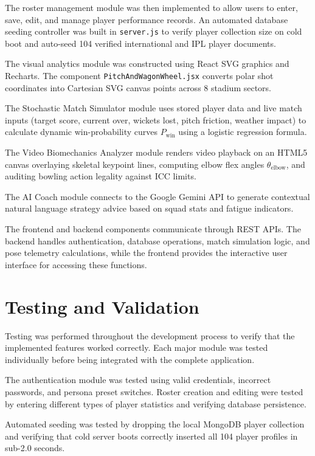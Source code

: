 The roster management module was then implemented to allow users to enter, save, edit, and manage player performance records. An automated database seeding controller was built in \texttt{server.js} to verify player collection size on cold boot and auto-seed 104 verified international and IPL player documents.

The visual analytics module was constructed using React SVG graphics and Recharts. The component \texttt{PitchAndWagonWheel.jsx} converts polar shot coordinates into Cartesian SVG canvas points across 8 stadium sectors.

The Stochastic Match Simulator module uses stored player data and live match inputs (target score, current over, wickets lost, pitch friction, weather impact) to calculate dynamic win-probability curves $P_{\text{win}}$ using a logistic regression formula.

The Video Biomechanics Analyzer module renders video playback on an HTML5 canvas overlaying skeletal keypoint lines, computing elbow flex angles $\theta_{\text{elbow}}$, and auditing bowling action legality against ICC limits.

The AI Coach module connects to the Google Gemini API to generate contextual natural language strategy advice based on squad stats and fatigue indicators.

The frontend and backend components communicate through REST APIs. The backend handles authentication, database operations, match simulation logic, and pose telemetry calculations, while the frontend provides the interactive user interface for accessing these functions.

\section{Testing and Validation}
Testing was performed throughout the development process to verify that the implemented features worked correctly. Each major module was tested individually before being integrated with the complete application.

The authentication module was tested using valid credentials, incorrect passwords, and persona preset switches. Roster creation and editing were tested by entering different types of player statistics and verifying database persistence.

Automated seeding was tested by dropping the local MongoDB player collection and verifying that cold server boots correctly inserted all 104 player profiles in sub-2.0 seconds.

